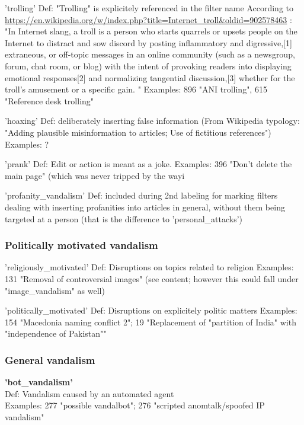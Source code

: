 'trolling'
  Def: "Trolling" is explicitely referenced in the filter name
  According to \url{https://en.wikipedia.org/w/index.php?title=Internet_troll&oldid=902578463} :
  "In Internet slang, a troll is a person who starts quarrels or upsets people on the Internet to distract and sow discord by posting inflammatory and digressive,[1] extraneous, or off-topic messages in an online community (such as a newsgroup, forum, chat room, or blog) with the intent of provoking readers into displaying emotional responses[2] and normalizing tangential discussion,[3] whether for the troll's amusement or a specific gain. "
  Examples: 896 "ANI trolling", 615 "Reference desk trolling"

'hoaxing'
  Def: deliberately inserting false information (From Wikipedia typology: "Adding plausible misinformation to articles; Use of fictitious references")
  Examples: ?

'prank'
  Def: Edit or action is meant as a joke. %
  Examples: 396 "Don't delete the main page" (which was never tripped by the way^^)

'profanity\_vandalism'
  Def: included during 2nd labeling for marking filters dealing with inserting profanities into articles in general, without them being targeted at a person (that is the difference to 'personal\_attacks')


\subsubsection{Politically motivated vandalism}
'religiously\_motivated'
Def: Disruptions on topics related to religion
Examples: 131 "Removal of controversial images" (see content; however this could fall under "image\_vandalism" as well)

'politically\_motivated'
Def: Disruptions on explicitely politic matters
Examples: 154 "Macedonia naming conflict 2"; 19 "Replacement of "partition of India" with "independence of Pakistan""

\subsubsection{General vandalism}

\textbf{'bot\_vandalism'}\\
 Def: Vandalism caused by an automated agent\\
 Examples: 277 "possible vandalbot"; 276 "scripted anomtalk/spoofed IP vandalism"\\

